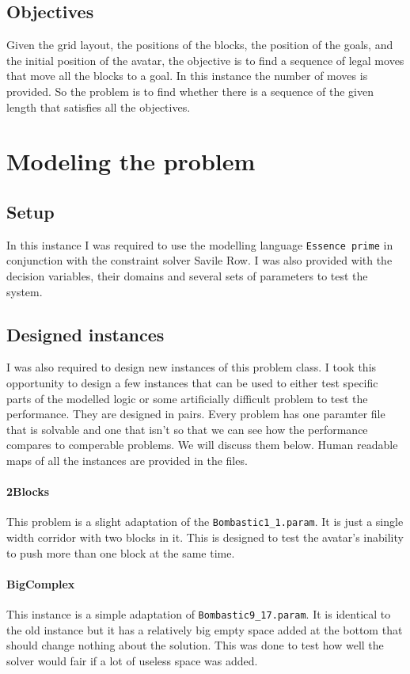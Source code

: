 \documentclass[british]{article}
\newcommand{\code}[1]{\texttt{#1}}
\begin{document}
\subsection{Objectives}
Given the grid layout, the positions of the blocks, the position of the goals, and the initial position of the avatar, the objective is to find a sequence of legal moves that move all the blocks to a goal. In this instance the number of moves is provided. So the problem is to find whether there is a sequence of the given length that satisfies all the objectives. 


\section{Modeling the problem}
\label{model}
\subsection{Setup}
In this instance I was required to use the modelling language \code{Essence prime} in conjunction with the constraint solver Savile Row. I was also provided with the decision variables, their domains and several sets of parameters to test the system.   

\subsection{Designed instances}
I was also required to design new instances of this problem class. I took this opportunity to design a few instances that can be used to either test specific parts of the modelled logic or some artificially difficult problem to test the performance. They are designed in pairs. Every problem has one paramter file that is solvable and one that isn't so that we can see how the performance compares to comperable problems. We will discuss them below. Human readable maps of all the instances are provided in the files. 

	\paragraph{2Blocks} This problem is a slight adaptation of the \code{Bombastic1\_1.param}. It is just a single width corridor with two blocks in it. This is designed to test the avatar's inability to push more than one block at the same time. 
	\paragraph{BigComplex} This instance is a simple adaptation of \code{Bombastic9\_17.param}.  It is identical to the old instance but it has a relatively big empty space added at the bottom that should change nothing about the solution. This was done to test how well the solver would fair if a lot of useless space was added. 
\end{document}
